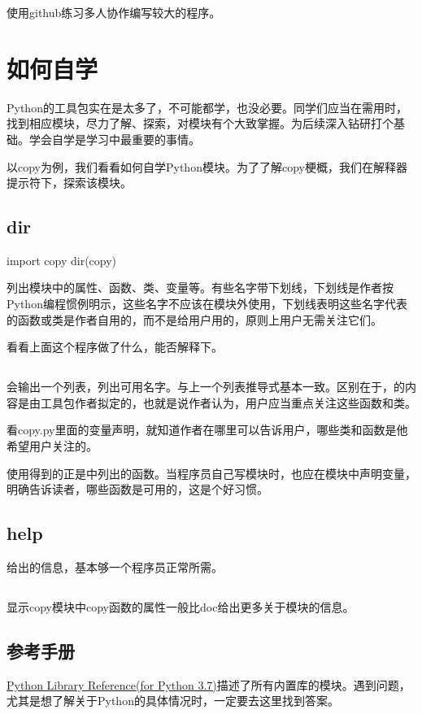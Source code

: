 使用github练习多人协作编写较大的程序。

\section{如何自学}
Python的工具包实在是太多了，不可能都学，也没必要。同学们应当在需用时，找到相应模块，尽力了解、探索，对模块有个大致掌握。为后续深入钻研打个基础。学会自学是学习中最重要的事情。

以copy为例，我们看看如何自学Python模块。为了了解copy梗概，我们在解释器提示符下，探索该模块。
\subsection{dir}
\begin{python}
import copy
dir(copy)  
\end{python}
列出模块中的属性、函数、类、变量等。有些名字带下划线，下划线是作者按Python编程惯例明示，这些名字不应该在模块外使用，下划线表明这些名字代表的函数或类是作者自用的，而不是给用户用的，原则上用户无需关注它们。
\begin{python}
\end{python}
看看上面这个程序做了什么，能否解释下。
\subsection{}
会输出一个列表，列出可用名字。与上一个列表推导式基本一致。区别在于，的内容是由工具包作者拟定的，也就是说作者认为，用户应当重点关注这些函数和类。

看copy.py里面的变量声明，就知道作者在哪里可以告诉用户，哪些类和函数是他希望用户关注的。

使用得到的正是中列出的函数。当程序员自己写模块时，也应在模块中声明变量，明确告诉读者，哪些函数是可用的，这是个好习惯。
\subsection{help}
给出的信息，基本够一个程序员正常所需。
\subsection{}
显示copy模块中copy函数的属性一般比doc给出更多关于模块的信息。
\subsection{参考手册}
\href{https://docs.python.org/3.7/library/index.html}{Python Library Reference(for Python 3.7)}描述了所有内置库的模块。遇到问题，尤其是想了解关于Python的具体情况时，一定要去这里找到答案。
